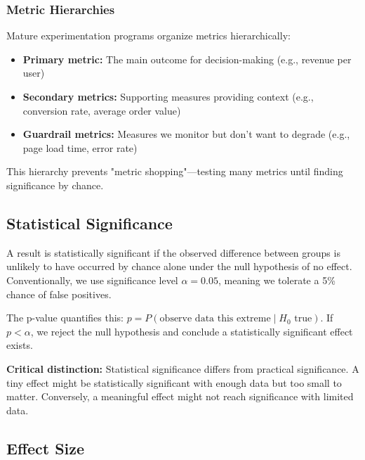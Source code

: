 \subsubsection{Metric Hierarchies}

Mature experimentation programs organize metrics hierarchically:

\begin{itemize}
    \item \textbf{Primary metric:} The main outcome for decision-making (e.g., revenue per user)
    \item \textbf{Secondary metrics:} Supporting measures providing context (e.g., conversion rate, average order value)
    \item \textbf{Guardrail metrics:} Measures we monitor but don't want to degrade (e.g., page load time, error rate)
\end{itemize}

This hierarchy prevents "metric shopping"—testing many metrics until finding significance by chance.

\subsection{Statistical Significance}

\begin{definition}
A result is statistically significant if the observed difference between groups is unlikely to have occurred by chance alone under the null hypothesis of no effect. Conventionally, we use significance level $\alpha = 0.05$, meaning we tolerate a 5\% chance of false positives.
\end{definition}

The p-value quantifies this: $p = P(\text{observe data this extreme} \mid H_0 \text{ true})$. If $p < \alpha$, we reject the null hypothesis and conclude a statistically significant effect exists.

\textbf{Critical distinction:} Statistical significance differs from practical significance. A tiny effect might be statistically significant with enough data but too small to matter. Conversely, a meaningful effect might not reach significance with limited data.

\subsection{Effect Size}

